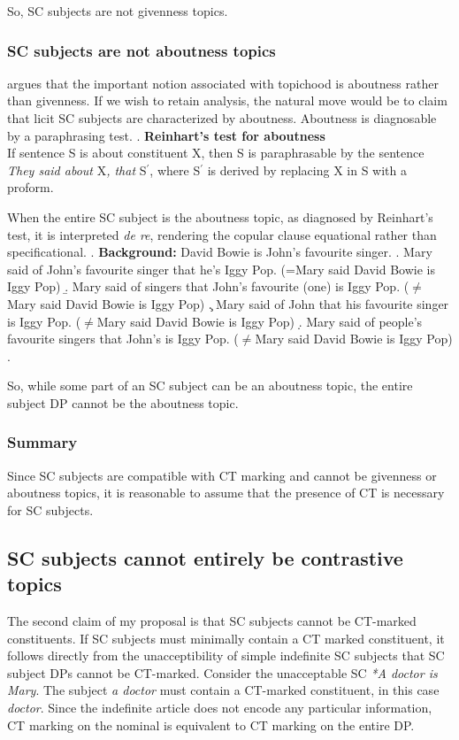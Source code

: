 \documentclass[GPFinal]{subfiles}
\begin{document}
So, SC subjects are not givenness topics.
\subsubsection{SC subjects are not aboutness topics}
\textcite{reinhart1981pragmatics} argues that the important notion associated with topichood is aboutness rather than givenness.
If we wish to retain  analysis, the natural move would be to claim that licit SC subjects are characterized by aboutness.
Aboutness is diagnosable by a paraphrasing test.
\ex. \textbf{Reinhart's test for aboutness}\\
If sentence S is about constituent X, then S is paraphrasable by the sentence \textit{They said about }X\textit{, that }S$^\prime$, where S$^\prime$ is derived by replacing X in S with a proform.

When the entire SC subject is the aboutness topic, as diagnosed by Reinhart's test, it is interpreted \textit{de re}, rendering the copular clause equational rather than specificational.
\ex. \textbf{Background:} David Bowie is John's favourite singer.
\a. Mary said of John's favourite singer that he's Iggy Pop. (=Mary said David Bowie is Iggy Pop)
\b. Mary said of singers that John's favourite (one) is Iggy Pop. ($\neq$Mary said David Bowie is Iggy Pop)
\c. Mary said of John that his favourite singer is Iggy Pop. ($\neq$Mary said David Bowie is Iggy Pop)
\d. Mary said of people's favourite singers that John's is Iggy Pop. ($\neq$Mary said David Bowie is Iggy Pop)
\z.

So, while some part of an SC subject can be an aboutness topic, the entire subject DP cannot be the aboutness topic.
\subsubsection{Summary}
Since SC subjects are compatible with CT marking and cannot be givenness or aboutness topics, it is reasonable to assume that the presence of CT is necessary for SC subjects.
\subsection{SC subjects cannot entirely be contrastive topics}
The second claim of my proposal is that SC subjects cannot be CT-marked constituents.
If SC subjects must minimally contain a CT marked constituent, it follows directly from the unacceptibility of simple indefinite SC subjects that SC subject DPs cannot be CT-marked.
Consider the unacceptable SC \textit{*A doctor is Mary}.
The subject \textit{a doctor} must contain a CT-marked constituent, in this case \textit{doctor}.
Since the indefinite article does not encode any particular information, CT marking on the nominal is equivalent to CT marking on the entire DP.
\end{document}
